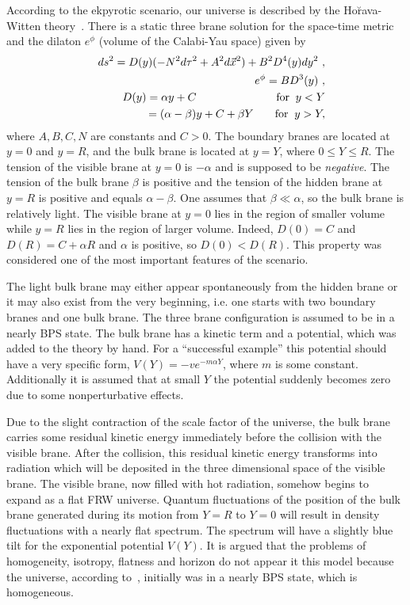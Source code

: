 \documentclass[a4paper,12pt]{article}
\begin{document}
According to the ekpyrotic scenario, our universe is described by the Ho\u{r}ava-Witten theory~\cite{HoravaWitten}. 
There is a  static  three brane solution for the space-time metric and the
dilaton $e^{\phi}$ (volume of the Calabi-Yau space) given by
\begin{eqnarray}
\nonumber & & ds^2=D(y)(-N^2d\tau^2+A^2d\vec{x}^2)+B^2 D^4(y)dy^2 \ ,
\nonumber\\ & & e^{\phi}=B D^3(y) \ , \nonumber\\ & & D(y)=\alpha y +C
\;\;\;\;\;\;\;\;\;\;\;\;\;\;\;\;\;\;\;\;\;\;\;\;\;\;{\rm
for}\;\;y<Y \\
& & \;\;\;\;\;\;\;\;\;=(\alpha-\beta)y+C+\beta Y \;\;\;\;\;\;\;{\rm
for}\;\;y>Y, \label{eq:static}
\end{eqnarray}
where $A,B,C,N$  are constants and $C>0$. The boundary branes are located
at $y=0$ and $y=R$, and the bulk brane is located at $y=Y$, where $0\leq
Y\leq R$.  The tension of the visible brane at $y=0$ is $-\alpha$ and is supposed to be {\it negative}.  The tension of the bulk brane $\beta$ is positive and the
tension of the hidden brane at $y=R$ is  positive and equals
$\alpha-\beta$. One assumes that $\beta \ll \alpha$, so the bulk brane is
relatively light. The visible brane at $y=0$ lies in the region of smaller
volume  while $y=R$ lies in the region of larger volume. Indeed, $D(0)= C$
and $D(R)= C + \alpha R$ and  $\alpha$ is positive, so $D(0) < D(R)$. This
property was considered one of the most important features of the scenario.

 
The light bulk brane may either appear spontaneously from the hidden brane
or it may also exist from the very beginning, i.e. one starts with two
boundary branes and one bulk brane. The three brane configuration is
assumed to be in a nearly BPS state. The
bulk brane has a kinetic term and a potential, which was added to the theory by hand. For a ``successful
example'' this potential should have a very specific form,  $V(Y)= -v e^{-m\alpha Y}$, where $m$ is some constant. Additionally  it is
assumed that at small $Y$ the potential suddenly becomes zero due to some
nonperturbative effects.

 Due to the slight contraction of the scale factor of the universe, the bulk  brane carries some residual kinetic energy
immediately before the collision with the visible brane. After the
collision, this residual kinetic energy transforms into radiation which
will be deposited in the three dimensional space of the visible  brane.
The visible brane, now filled with hot radiation, somehow begins to expand
as a flat FRW universe. 
Quantum fluctuations of the position of the bulk brane generated during
its  motion from $Y= R$ to $Y=0$  will result in  density fluctuations
with a nearly flat spectrum.  The spectrum will have a slightly blue tilt
for the exponential potential $V(Y)$. It is argued that the problems of homogeneity, isotropy, flatness and horizon do not appear it this model because the universe, according to~\cite{KOST}, initially was in a nearly BPS state, which is homogeneous.
\end{document}
